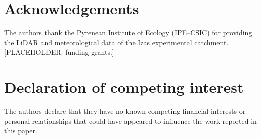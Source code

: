 \documentclass[preprint,12pt]{elsarticle}
\begin{document}
\section*{Acknowledgements}
The authors thank the Pyrenean Institute of Ecology (IPE--CSIC) for
providing the LiDAR and meteorological data of the Izas experimental
catchment. [PLACEHOLDER: funding grants.]

\section*{Declaration of competing interest}
The authors declare that they have no known competing financial interests or
personal relationships that could have appeared to influence the work
reported in this paper.



\end{document}
